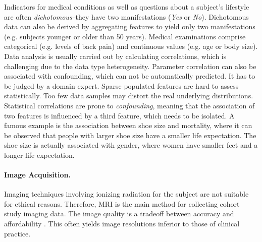 \documentclass[journal]{style/vgtc} 			          %
\newcommand{\rem}[1]{\textcolor{red}{\sout{#1}}}
\begin{document}
Indicators for medical conditions as well as questions about a subject's lifestyle are often \emph{dichotomous}--they have two manifestations (\emph{Yes} or \emph{No}).
%
Dichotomous data can also be derived by aggregating features to yield only two manifestations (e.g. subjects younger or older than 50 years).
%
Medical examinations comprise categorical (e.g. levels of back pain) and continuous values (e.g. age or body size).
%
Data analysis is usually carried out by calculating correlations,
which is challenging due to the data type heterogeneity.
%
Parameter correlation can also be associated with confounding, which can not be automatically predicted. 
%
It has to be judged by a domain expert.
%
Sparse populated features are hard to assess statistically.
%
Too few data samples may distort the real underlying distributions.
%
Statistical correlations are prone to \emph{confounding}, meaning that the association of two features is influenced by a third feature, which needs to be isolated.
%
A famous example is the association between shoe size and mortality, where it can be observed that people with larger shoe size have a smaller life expectation. %
%
The shoe size is actually associated with gender, where women have smaller feet and a longer life expectation.

\paragraph{Image Acquisition.} Imaging techniques involving ionizing radiation for the subject are not suitable for ethical reasons.
%
Therefore, MRI is the main method for collecting cohort study imaging data.
%
The image quality is a tradeoff between accuracy and affordability \cite{Preim2014}.
%
This often yields image resolutions inferior to those of clinical practice.%
%
\end{document}
